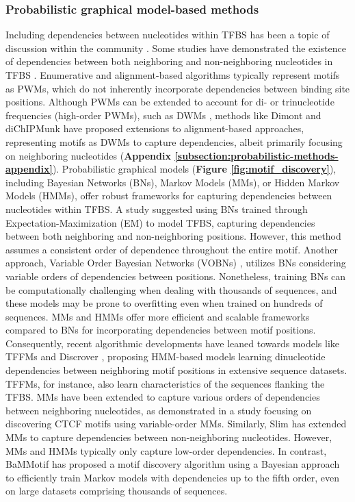 \documentclass[a4paper, titlepage, openright]{book}
\begin{document}
\subsubsection{Probabilistic graphical model-based methods}
Including dependencies between nucleotides within TFBS has been a topic of discussion within the community \citep{tomovic2007position,morris2011jury,zhao2011quantitative}. Some studies have demonstrated the existence of dependencies between both neighboring and non-neighboring nucleotides in TFBS \citep{slattery2014absence,rohs2010origins}. Enumerative and alignment-based algorithms typically represent motifs as PWMs, which do not inherently incorporate dependencies between binding site positions. Although PWMs can be extended to account for di- or trinucleotide frequencies (high-order PWMs), such as DWMs \citep{siddharthan2010dinucleotide}, methods like Dimont \citep{grau2013general} and diChIPMunk \citep{kulakovskiy2013binding} have proposed extensions to alignment-based approaches, representing motifs as DWMs to capture dependencies, albeit primarily focusing on neighboring nucleotides (\textbf{Appendix \ref{subsection:probabilistic-methods-appendix}}). Probabilistic graphical models (\textbf{Figure \ref{fig:motif_discovery}}), including Bayesian Networks (BNs), Markov Models (MMs), or Hidden Markov Models (HMMs), offer robust frameworks for capturing dependencies between nucleotides within TFBS. A study \citep{barash2003modeling} suggested using BNs trained through Expectation-Maximization (EM) to model TFBS, capturing dependencies between both neighboring and non-neighboring positions. However, this method assumes a consistent order of dependence throughout the entire motif. Another approach, Variable Order Bayesian Networks (VOBNs) \citep{ben2005identification}, utilizes BNs considering variable orders of dependencies between positions. Nonetheless, training BNs can be computationally challenging when dealing with thousands of sequences, and these models may be prone to overfitting even when trained on hundreds of sequences. MMs and HMMs offer more efficient and scalable frameworks compared to BNs for incorporating dependencies between motif positions. Consequently, recent algorithmic developments have leaned towards models like TFFMs \citep{mathelier2013next} and Discrover \citep{maaskola2014binding}, proposing HMM-based models learning dinucleotide dependencies between neighboring motif positions in extensive sequence datasets. TFFMs, for instance, also learn characteristics of the sequences flanking the TFBS. MMs have been extended to capture various orders of dependencies between neighboring nucleotides, as demonstrated in a study \citep{eggeling2014value} focusing on discovering CTCF \citep{bell1999protein} motifs using variable-order MMs. Similarly, Slim \citep{keilwagen2015varying} has extended MMs to capture dependencies between non-neighboring nucleotides. However, MMs and HMMs typically only capture low-order dependencies. In contrast, BaMMotif \citep{siebert2016bayesian,ge2021bayesian} has proposed a motif discovery algorithm using a Bayesian approach to efficiently train Markov models with dependencies up to the fifth order, even on large datasets comprising thousands of sequences.
\end{document}
